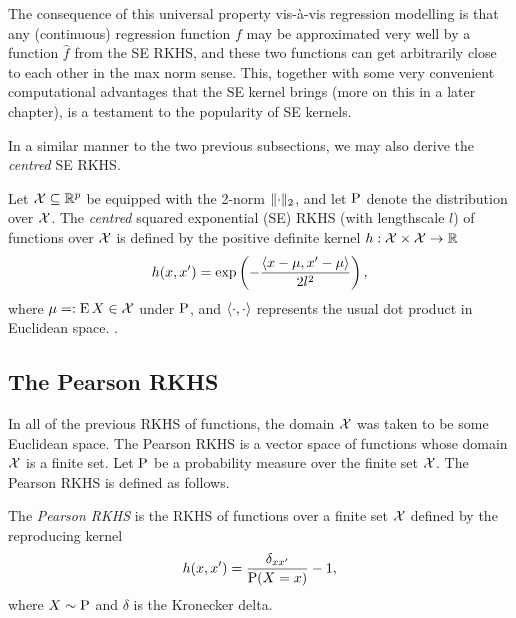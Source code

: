 \documentclass[a4paper,showframe,11pt,draft]{report}
\begin{document}
The consequence of this universal property vis-à-vis regression modelling is that any (continuous) regression function $f$ may be approximated very well by a function $\hat f$ from the SE RKHS, and these two functions can get arbitrarily close to each other in the max norm sense.
This, together with some very convenient computational advantages that the SE kernel brings (more on this in a later chapter), is a testament to the popularity of SE kernels.

In a similar manner to the two previous subsections, we may also derive the \emph{centred} SE RKHS. 

\begin{definition}
  Let ${\mathcal X} \subseteq \mathbb{R}^p$ be equipped with the 2-norm $\lVert\cdot\rVert_2$, and let $\operatorname{P}$ denote the distribution over ${\mathcal X}$.
  The \emph{centred} squared exponential (SE) RKHS (with lengthscale $l$) of functions over ${\mathcal X}$ is defined by the positive definite kernel $h:{\mathcal X}\times{\mathcal X}\to\mathbb{R}$ 
  \[
    h(x,x') = \exp\left(-\frac{\langle x-\mu,x'-\mu\rangle}{2l^2} \right),
  \]
  where $\mu =: \operatorname{E} X \in{\mathcal X} $ under $\operatorname{P}$, and $\langle\cdot,\cdot\rangle$ represents the usual dot product in Euclidean space.
  .
\end{definition}


\subsection{The Pearson RKHS}

In all of the previous RKHS of functions, the domain ${\mathcal X}$ was taken to be some Euclidean space. 
The Pearson RKHS is a vector space of functions whose domain ${\mathcal X}$ is a finite set.
Let $\operatorname{P}$ be a probability measure over the finite set ${\mathcal X}$. 
The Pearson RKHS is defined as follows.

\begin{definition}
  The \emph{Pearson RKHS} is the RKHS of functions over a finite set ${\mathcal X}$ defined by the reproducing kernel
  \[
    h(x,x') = \frac{\delta_{xx'}}{\operatorname{P}(X=x)} - 1,
  \]
  where $X \sim \operatorname{P}$ and $\delta$ is the Kronecker delta.
\end{definition}
\end{document}
